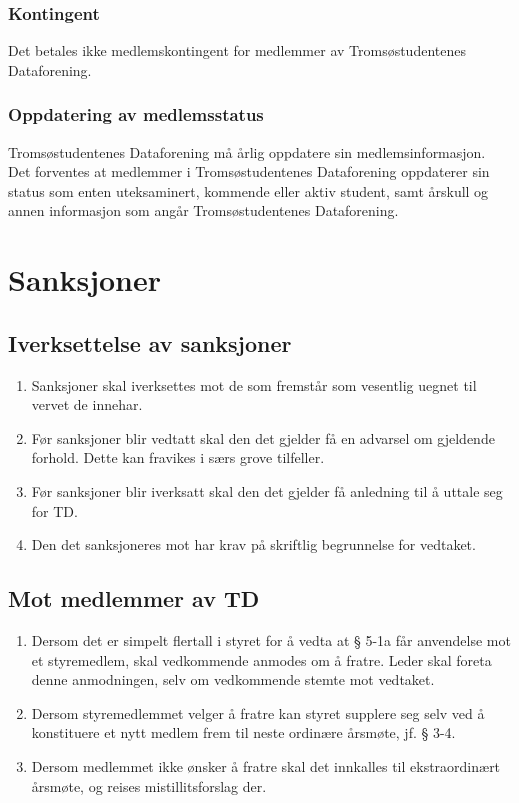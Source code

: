 \documentclass[11pt]{article}
\begin{document}
\subsubsection{Kontingent}
Det betales ikke medlemskontingent for medlemmer av Tromsøstudentenes Dataforening.

\subsubsection{Oppdatering av medlemsstatus}
Tromsøstudentenes Dataforening må årlig oppdatere sin medlemsinformasjon.
Det forventes at medlemmer i Tromsøstudentenes Dataforening oppdaterer sin status som enten uteksaminert, kommende eller aktiv student, samt årskull og annen informasjon som angår Tromsøstudentenes Dataforening.

\section{Sanksjoner}
\subsection{Iverksettelse av sanksjoner}
\begin{enumerate}
	\item Sanksjoner skal iverksettes mot de som fremstår som vesentlig uegnet til vervet de innehar.
	\item Før sanksjoner blir vedtatt skal den det gjelder få en advarsel om gjeldende forhold. Dette kan fravikes i særs grove tilfeller.
	\item Før sanksjoner blir iverksatt skal den det gjelder få anledning til å uttale seg for TD.
	\item Den det sanksjoneres mot har krav på skriftlig begrunnelse for vedtaket.
\end{enumerate}

\subsection{Mot medlemmer av TD}
\begin{enumerate}
	\item Dersom det er simpelt flertall i styret for å vedta at § 5-1a får anvendelse mot et styremedlem, skal vedkommende anmodes om å fratre. Leder skal foreta denne anmodningen, selv om vedkommende stemte mot vedtaket.
	\item Dersom styremedlemmet velger å fratre kan styret supplere seg selv ved å konstituere et nytt medlem frem til neste ordinære årsmøte, jf. § 3-4.
	\item Dersom medlemmet ikke ønsker å fratre skal det innkalles til ekstraordinært årsmøte, og reises mistillitsforslag der.
\end{enumerate}
\end{document}
